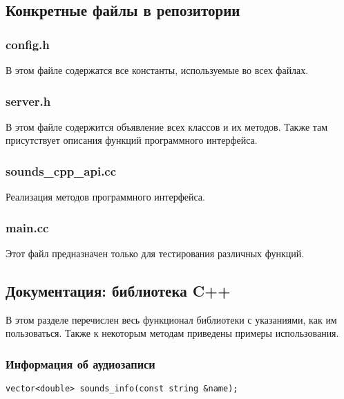 \documentclass[14pt,a4paper]{article}
\begin{document}
\subsection{Конкретные файлы в репозитории}

\subsubsection*{config.h}

В этом файле содержатся все константы, используемые во всех файлах.

\subsubsection*{server.h}

В этом файле содержится объявление всех классов и их методов. Также там присутствует описания функций программного интерфейса.

\subsubsection*{sounds\_cpp\_api.cc}

Реализация методов программного интерфейса.

\subsubsection*{main.cc}

Этот файл предназначен только для тестирования различных функций.

\subsection{Документация: библиотека C++}


В этом разделе перечислен весь функционал библиотеки с указаниями, как им пользоваться. Также к некоторым методам приведены примеры использования.

\subsubsection*{Информация об аудиозаписи}

\begin{lstlisting}
vector<double> sounds_info(const string &name);
\end{lstlisting}
\end{document}
